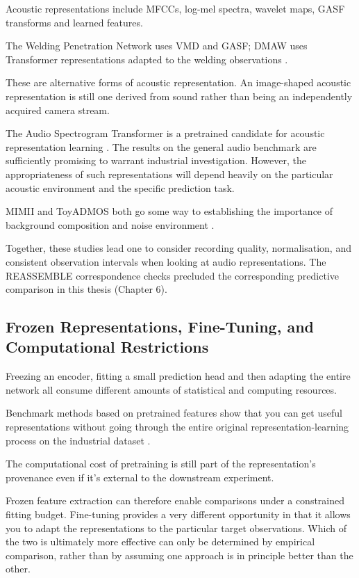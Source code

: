 Acoustic representations include MFCCs, log-mel spectra, wavelet maps, GASF transforms and learned
features.

The Welding Penetration Network uses VMD and GASF; DMAW uses Transformer representations adapted to
the welding observations \parencite{Hua2026Weld,P003}.

These are alternative forms of acoustic representation. An image-shaped acoustic representation is
still one derived from sound rather than being an independently acquired camera stream.

The Audio Spectrogram Transformer is a pretrained candidate for acoustic representation learning
\parencite{P011}. The results on the general audio benchmark are sufficiently promising to warrant
industrial investigation. However, the appropriateness of such representations will depend heavily
on the particular acoustic environment and the specific prediction task.

MIMII and ToyADMOS both go some way to establishing the importance of background composition and
noise environment \parencite{Purohit2019MIMII,Koizumi2019ToyADMOS}.

Together, these studies lead one to consider recording quality, normalisation, and consistent
observation intervals when looking at audio representations. The REASSEMBLE correspondence checks
precluded the corresponding predictive comparison in this thesis (Chapter 6).

\subsection{Frozen Representations, Fine-Tuning, and Computational Restrictions}

Freezing an encoder, fitting a small prediction head and then adapting the entire network all
consume different amounts of statistical and computing resources.

Benchmark methods based on pretrained features show that you can get useful representations without
going through the entire original representation-learning process on the industrial dataset
\parencite{Roth2022Towards,Costanzino2024Multimodal}.

The computational cost of pretraining is still part of the representation's provenance even if it's
external to the downstream experiment.

Frozen feature extraction can therefore enable comparisons under a constrained fitting budget.
Fine-tuning provides a very different opportunity in that it allows you to adapt the representations
to the particular target observations. Which of the two is ultimately more effective can only be
determined by empirical comparison, rather than by assuming one approach is in principle better than
the other.

